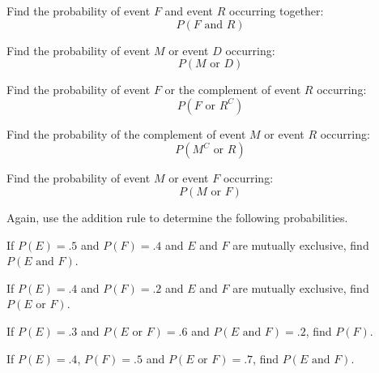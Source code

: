 \begin{puzzle}
    Find the probability of event \( F \) and event \( R \) occurring together:
    \[ P(F \text{ and } R) \]
\end{puzzle}

\begin{puzzle}
    Find the probability of event \( M \) or event \( D \) occurring:
    \[ P(M \text{ or } D) \]
\end{puzzle}

\begin{puzzle}
    Find the probability of event \( F \) or the complement of event \( R \) occurring:
    \[ P(F \text{ or } R^C) \]
\end{puzzle}

\begin{puzzle}
    Find the probability of the complement of event \( M \) or event \( R \) occurring:
    \[ P(M^C \text{ or } R) \]
\end{puzzle}

\begin{puzzle}
    Find the probability of event \( M \) or event \( F \) occurring:
    \[ P(M \text{ or } F) \]
\end{puzzle}

Again, use the addition rule to determine the following probabilities.

\begin{puzzle}
    If \( P(E) = .5 \) and \( P(F) = .4 \) and \( E \) and \( F \) are mutually exclusive, find \( P(E \text{ and } F) \).
\end{puzzle}

\begin{puzzle}
    If \( P(E) = .4 \) and \( P(F) = .2 \) and \( E \) and \( F \) are mutually exclusive, find \( P(E \text{ or } F) \).
\end{puzzle}

\begin{puzzle}
    If \( P(E) = .3 \) and \( P(E \text{ or } F) = .6 \) and \( P(E \text{ and } F) = .2 \), find \( P(F) \).
\end{puzzle}

\begin{puzzle}
    If \( P(E) = .4 \), \( P(F) = .5 \) and \( P(E \text{ or } F) = .7 \), find \( P(E \text{ and } F) \).
\end{puzzle}
